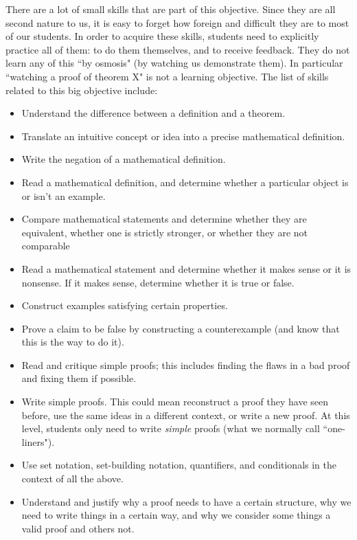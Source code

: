\documentclass[11pt]{article}
\begin{document}
{\baselineskip
There are a lot of small skills that are part of this objective.  Since they are all second nature to us, it is easy to forget how foreign and difficult they are to most of our students.  In order to acquire these skills, students need to explicitly practice all of them: to do them themselves, and to receive feedback.    They do not learn any of this ``by osmosis" (by watching us demonstrate them).  In particular  
``watching a proof of theorem X" is not a learning objective.}
The list of skills related to this big objective include:
	\begin{itemize}
		\item Understand the difference between a definition and a theorem.
		\item  Translate an intuitive concept or idea into a precise mathematical definition.
		\item  Write the negation of a mathematical definition.
		\item  Read a mathematical definition, and determine whether a particular object is or isn't an example.
		\item  Compare mathematical statements and determine whether they are equivalent, whether one is strictly stronger, or whether they are not comparable
		\item  Read a mathematical statement and determine whether it makes sense or it is nonsense.  If it makes sense, determine whether it is true or false.
		\item Construct examples satisfying certain properties.
		\item Prove a claim to be false by constructing a counterexample (and know that this is the way to do it).
		\item Read and critique simple proofs; this includes finding the flaws in a bad proof and fixing them if possible.
		\item Write simple proofs. This could mean reconstruct a proof they have seen before, use the same ideas in a different context, or write a new proof. At this level, students only need to write \emph{simple} proofs (what we normally call ``one-liners").
		\item Use set notation, set-building notation, quantifiers, and conditionals in the context of all the above.
		\item Understand and justify why a proof needs to have a certain structure, why we need to write things in a certain way, and why we consider some things a valid proof and others not.  
		

\end{itemize}
\end{document}
